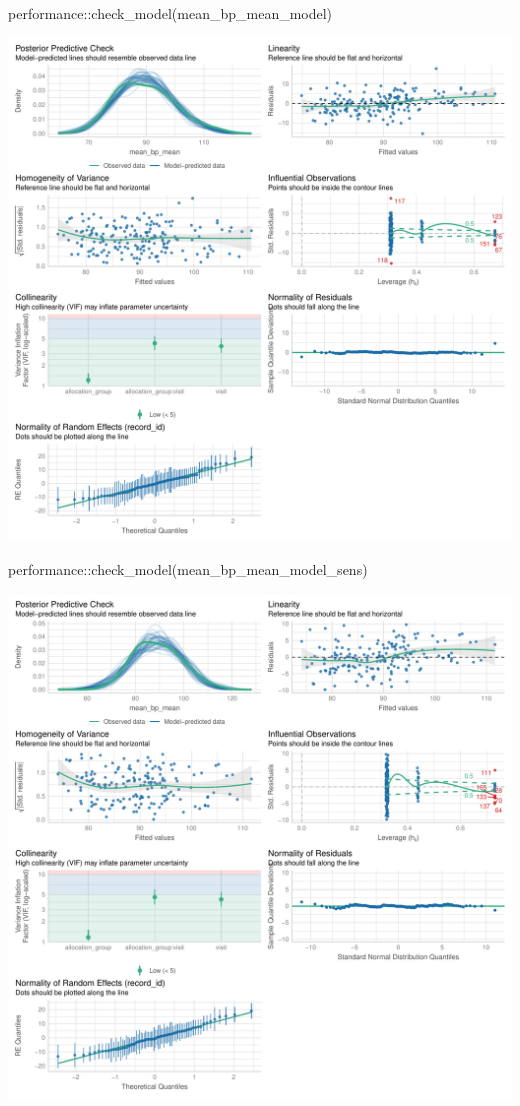 \documentclass[
  12pt,
]{article}
\newenvironment{Shaded}{\begin{snugshade}}{\end{snugshade}}
\newcommand{\FunctionTok}[1]{\textcolor[rgb]{0.28,0.35,0.67}{#1}}
\newcommand{\NormalTok}[1]{\textcolor[rgb]{0.00,0.23,0.31}{#1}}
\newcommand{\SpecialCharTok}[1]{\textcolor[rgb]{0.37,0.37,0.37}{#1}}
\begin{document}
\begin{Shaded}
\begin{Highlighting}[]
\NormalTok{performance}\SpecialCharTok{::}\FunctionTok{check\_model}\NormalTok{(mean\_bp\_mean\_model)}
\end{Highlighting}
\end{Shaded}

\includegraphics{Outcomes_files/figure-pdf/mean_bp_mean_4-1.pdf}

\begin{Shaded}
\begin{Highlighting}[]
\NormalTok{performance}\SpecialCharTok{::}\FunctionTok{check\_model}\NormalTok{(mean\_bp\_mean\_model\_sens)}
\end{Highlighting}
\end{Shaded}

\includegraphics{Outcomes_files/figure-pdf/mean_bp_mean_4-2.pdf}
\end{document}

